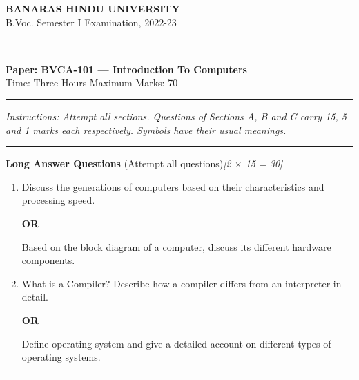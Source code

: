 \documentclass[11pt,a4paper]{article}
\newcommand{\pts}[1]{\hfill   \textit{[#1]}}
\begin{document}
\begin{center}
  {\large\bfseries BANARAS HINDU UNIVERSITY}\\[2pt]
  {
\normalsize B.Voc. Semester I Examination, 2022-23}\\[6pt]
  \rule{0.8\linewidth}{0.5pt}\\[6pt]
  {\large\bfseries Paper: BVCA-101 --- Introduction To Computers}\\[4pt]
  {
\normalsize Time: Three Hours \hfill Maximum Marks: 70}
\end{center}

\rule{\linewidth}{0.4pt}

\smallskip



\noindent   \textit{Instructions: Attempt all sections. Questions of Sections A, B and C carry 15, 5 and 1 marks each respectively. Symbols have their usual meanings.}

\bigskip

\bigskip



\rule{\linewidth}{0.4pt}\smallskip




\noindent   \textbf{Long Answer Questions} (Attempt all questions)\pts{2 $ \times$ 15 = 30}

\begin{enumerate}[label=\arabic*.,leftmargin=*,itemsep=12pt]
  \item Discuss the generations of computers based on their characteristics and processing speed.
  
\begin{center}   \textbf{OR}\end{center}
  Based on the block diagram of a computer, discuss its different hardware components.
  \item What is a Compiler? Describe how a compiler differs from an interpreter in detail.
  
\begin{center}   \textbf{OR}\end{center}
  Define operating system and give a detailed account on different types of operating systems.
\end{enumerate}

\bigskip



\rule{\linewidth}{0.4pt}\smallskip
\end{document}
